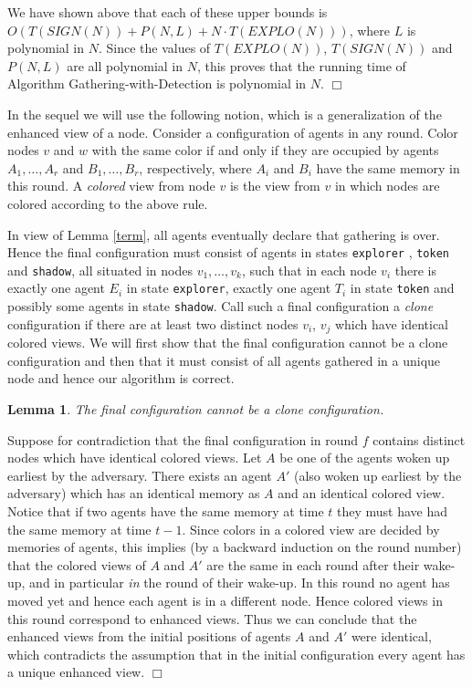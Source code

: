 \documentclass[11pt]{article}
\newtheorem{lemma}{Lemma}[section]
\newcommand{\qed}{\hfill $\Box$ \bigbreak}
\newenvironment{proof}{\noindent {\bf Proof.}}{\qed}
\begin{document}
\begin{proof}
   We have shown above that each of these upper bounds is {$O(T(SIGN(N))+P(N,L)+N \cdot T(EXPLO(N)))$}, where $L$ is polynomial in $N$. Since the values of
 $T(EXPLO(N))$, $T(SIGN(N))$ and $P(N,L)$ are all polynomial in $N$, this proves that the running time of  Algorithm Gathering-with-Detection is polynomial in $N$.    
\end{proof}

In the sequel we will use the following notion, which is a generalization of the enhanced view of a node. Consider a configuration of agents in any round.
Color nodes $v$ and $w$ with the same color if and only if they are occupied by agents $A_1,\dots ,A_r$ and $B_1, \dots ,B_r$, respectively, where $A_i$ and $B_i$
have the same memory in this round. A {\em colored} view from node $v$ is the view from $v$ in which nodes are colored according to the above rule. 

In view of Lemma \ref{term}, all agents eventually declare that gathering is over. Hence the final configuration must consist of agents in states  {\tt explorer} , 
{\tt token} and {\tt shadow}, all situated in nodes $v_1, \dots ,v_k$, such that in each node $v_i$ there is exactly one agent $E_i$ in state {\tt explorer}, exactly one
agent $T_i$ in state {\tt token}  and possibly some agents in state  {\tt shadow}. Call such a final configuration a {\em clone} configuration if there are at least two
distinct nodes $v_i$, $v_j$ which have identical colored views. We will first show that the final configuration cannot be a clone configuration
and then that it must consist of all agents
gathered in a unique node and hence our algorithm is correct. 
 

 
 \begin{lemma}\label{clone}
 The final configuration cannot be a clone configuration.
\end{lemma}

\begin{proof}
Suppose for contradiction that the final configuration in round $f$ contains distinct nodes which have identical colored views.
Let $A$ be one of the agents woken up earliest by the adversary. There exists an agent $A'$ (also woken up earliest by the adversary) which has an
identical memory as $A$ and an identical colored view.
Notice that if two agents have the same memory at time $t$ they must have had the same memory at time $t-1$. Since colors in a colored view
are decided by memories of agents, this implies (by a backward induction on the round number) that the colored views of $A$ and $A'$ are the same in each round 
after their wake-up, and in particular {\em in} the round of their wake-up. In this round no agent has moved yet and hence each agent is in a different node. Hence colored
views in this round correspond to enhanced views. Thus we can conclude that the enhanced views from the initial positions of agents $A$ and $A'$ were identical,
which contradicts the assumption that in the initial configuration every agent has a unique enhanced view.
\end{proof}
 
\end{document}
